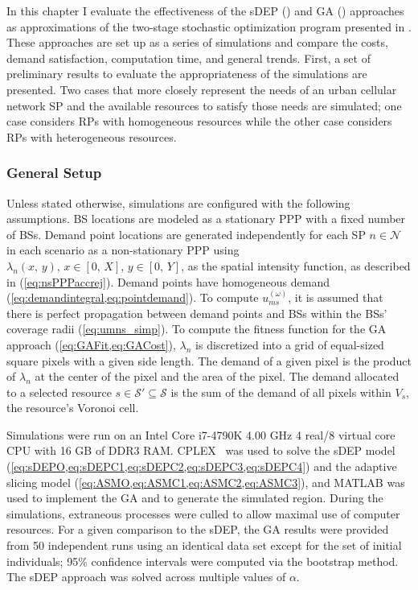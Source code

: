 \documentclass[12pt,dvipsnames]{report}
\begin{document}
In this chapter I evaluate the effectiveness of the sDEP () and GA () approaches as approximations of the two-stage stochastic optimization program presented in .  These approaches are set up as a series of simulations and compare the costs, demand satisfaction, computation time, and general trends.  First, a set of preliminary results to evaluate the appropriateness of the simulations are presented.  Two cases that more closely represent the needs of an urban cellular network SP and the available resources to satisfy those needs are simulated; one case considers RPs with homogeneous resources while the other case considers RPs with heterogeneous resources.

\subsubsection{General Setup}

Unless stated otherwise, simulations are configured with the following assumptions.  BS locations are modeled as a stationary PPP with a fixed number of BSs.  Demand point locations are generated independently for each SP $n \in \mathcal{N}$ in each scenario as a non-stationary PPP using $\lambda_n\left( x,\, y \right),\, x \in \left[ 0,\, X \right],\, y \in \left[ 0,\, Y \right]$, as the spatial intensity function, as described in  (\cref{eq:nsPPPaccrej}).  Demand points have homogeneous demand (\cref{eq:demandintegral,eq:pointdemand}).  To compute $u_{ms}^{\left( \omega \right)}$, it is assumed that there is perfect propagation between demand points and BSs within the BSs' coverage radii (\cref{eq:umns_simp}).  To compute the fitness function for the GA approach (\cref{eq:GAFit,eq:GACost}), $\lambda_n$ is discretized into a grid of equal-sized square pixels with a given side length.  The demand of a given pixel is the product of $\lambda_n$ at the center of the pixel and the area of the pixel.  The demand allocated to a selected resource $s \in \mathcal{S}' \subseteq \mathcal{S}$ is the sum of the demand of all pixels within $V_s$, the resource's Voronoi cell.

Simulations were run on an Intel Core i7-4790K 4.00 GHz 4 real/8 virtual core CPU with 16 GB of DDR3 RAM.  CPLEX~\cite{Cplex} was used to solve the sDEP model (\cref{eq:sDEPO,eq:sDEPC1,eq:sDEPC2,eq:sDEPC3,eq:sDEPC4}) and the adaptive slicing model (\cref{eq:ASMO,eq:ASMC1,eq:ASMC2,eq:ASMC3}), and MATLAB was used to implement the GA and to generate the simulated region.  During the simulations, extraneous processes were culled to allow maximal use of computer resources.  For a given comparison to the sDEP, the GA results were provided from 50 independent runs using an identical data set except for the set of initial individuals; 95\% confidence intervals were computed via the bootstrap method.  The sDEP approach was solved across multiple values of $\alpha$.
\end{document}
